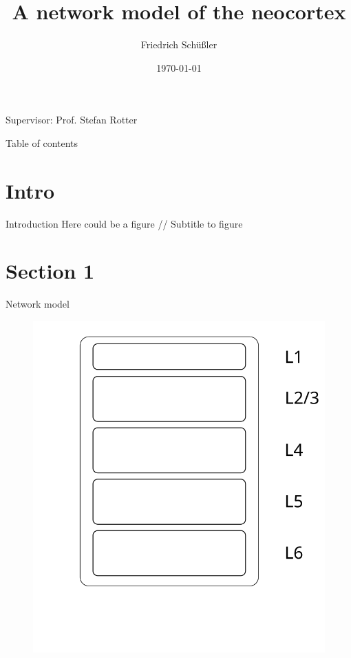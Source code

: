 \documentclass[xcolor=x11names,compress]{beamer}
\renewcommand{\(}{\begin{columns}}
\renewcommand{\)}{\end{columns}}
\newcommand{\<}[1]{\begin{column}{#1}}
\renewcommand{\>}{\end{column}}
\begin{document}
\begin{frame}{}
\title[Neocortex]{A network model of the neocortex}
\author{
Friedrich Schüßler}
\date{\today}
\titlepage

\centering 
Supervisor: Prof. Stefan Rotter
\end{frame}

\begin{frame}{Table of contents}
    \tableofcontents
\end{frame}



\section{Intro}
\begin{frame}[t]{Introduction}
Here could be a figure //
Subtitle to figure
\end{frame}

\section{Section 1}
\begin{frame}[t]{Network model}
\begin{figure}[htpb]
    \centering
    \includegraphics[width=0.5\linewidth]{../figures/microcircuit_model_pre}
\label{fig:setup_1}
\end{figure}
\end{frame}
\end{document}
